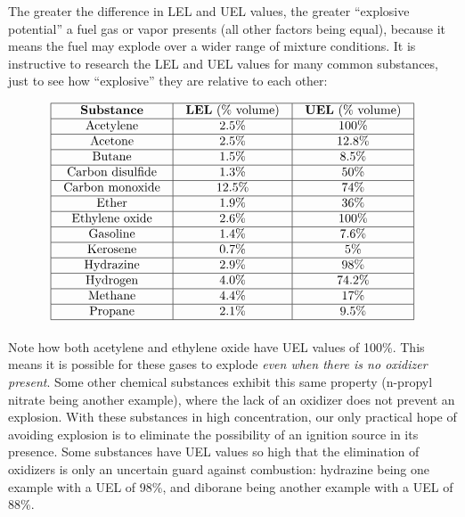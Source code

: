 \filbreak

The greater the difference in LEL and UEL values, the greater ``explosive potential'' a fuel gas or vapor presents (all other factors being equal), because it means the fuel may explode over a wider range of mixture conditions.  It is instructive to research the LEL and UEL values for many common substances, just to see how ``explosive'' they are relative to each other:


$$\vbox{\offinterlineskip
\halign{\strut
\vrule \quad\hfil # \ \hfil & 
\vrule \quad\hfil # \ \hfil & 
\vrule \quad\hfil # \ \hfil \vrule \cr
\noalign{\hrule}
%
\textbf{Substance} & \textbf{LEL} (\% volume) & \textbf{UEL} (\% volume) \cr
%
\noalign{\hrule}
%
Acetylene & 2.5\% & 100\% \cr
%
\noalign{\hrule}
%
Acetone & 2.5\% & 12.8\% \cr
%
\noalign{\hrule}
%
Butane & 1.5\% & 8.5\% \cr
%
\noalign{\hrule}
%
Carbon disulfide & 1.3\% & 50\% \cr
%
\noalign{\hrule}
%
Carbon monoxide & 12.5\% & 74\% \cr
%
\noalign{\hrule}
%
Ether & 1.9\% & 36\% \cr
%
\noalign{\hrule}
%
Ethylene oxide & 2.6\% & 100\% \cr
%
\noalign{\hrule}
%
Gasoline & 1.4\% & 7.6\% \cr
%
\noalign{\hrule}
%
Kerosene & 0.7\% & 5\% \cr
%
\noalign{\hrule}
%
Hydrazine & 2.9\% & 98\% \cr
%
\noalign{\hrule}
%
Hydrogen & 4.0\% & 74.2\% \cr
%
\noalign{\hrule}
%
Methane & 4.4\% & 17\% \cr
%
\noalign{\hrule}
%
Propane & 2.1\% & 9.5\% \cr
%
\noalign{\hrule}
} %
}$$ %

Note how both acetylene and ethylene oxide have UEL values of 100\%.  This means it is possible for these gases to explode \textit{even when there is no oxidizer present}.  Some other chemical substances exhibit this same property (n-propyl nitrate being another example), where the lack of an oxidizer does not prevent an explosion.  With these substances in high concentration, our only practical hope of avoiding explosion is to eliminate the possibility of an ignition source in its presence.  Some substances have UEL values so high that the elimination of oxidizers is only an uncertain guard against combustion: hydrazine being one example with a UEL of 98\%, and diborane being another example with a UEL of 88\%.  








